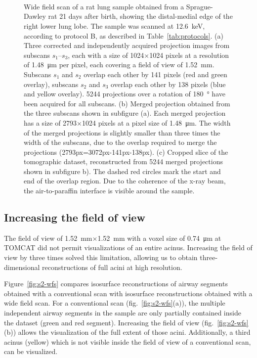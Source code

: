 \begin{figure}
	\centering
	\caption{Wide field scan of a rat lung sample obtained from a Sprague-Dawley rat 21 days after birth, showing the distal-medial edge of the right lower lung lobe. The sample was scanned at \SI{12.6}{\kilo\electronvolt}, according to protocol B, as described in Table~\ref{tab:protocols}. %
			(a) Three corrected and independently acquired projection images from subscans $s_1$--$s_3$, each with a size of 1024\(\times\)1024 pixels at a resolution of \SI{1.48}{\micro\meter} per pixel, each covering a field of view of \SI{1.52}{\milli\meter}. Subscans $s_1$ and $s_2$ overlap each other by 141 pixels (red and green overlay), subscans $s_2$ and $s_3$ overlap each other by 138 pixels (blue and yellow overlay). 5244 projections over a rotation of \SI{180}{\degree} have been acquired for all subscans. %
			(b) Merged projection obtained from the three subscans shown in subfigure (a). Each merged projection has a size of 2793\(\times\)1024 pixels at a pixel size of \SI{1.48}{\micro\meter}. The width of the merged projections is slightly smaller than three times the width of the subscans, due to the overlap required to merge the projections (2793px=3072px-141px-138px). %
			(c) Cropped slice of the tomographic dataset, reconstructed from 5244 merged projections shown in subfigure b). The dashed red circles mark the start and end of the overlap region. Due to the coherence of the x-ray beam, the air-to-paraffin interface is visible around the sample.}
	\ifiucr
		\\%
		\\%
		\\%
	\else
	\fi
	\label{fig:wide-field-scan-results}
\end{figure}

\subsection{Increasing the field of view}
The field of view of \SI{1.52}{\milli\meter}$\times$\SI{1.52}{\milli\meter} with a voxel size of \SI{0.74}{\micro\meter} at TOMCAT did not permit visualizations of an entire acinus. Increasing the field of view by three times solved this limitation, allowing us to obtain three-dimensional reconstructions of full acini \cbstart at high resolution\cbend.

Figure~\ref{fig:s2-wfs} compares isosurface reconstructions of airway segments obtained with a conventional scan with isosurface reconstructions obtained with a wide field scan. For a conventional scan (fig.~\ref{fig:s2-wfs}(a)), the multiple independent airway segments in the sample are only partially contained inside the dataset (green and red segment). Increasing the field of view (fig.~\ref{fig:s2-wfs}(b)) allows the visualization of the full extent of those acini. Additionally, a third acinus (yellow) which is not visible inside the field of view of a conventional scan, can be visualized.

